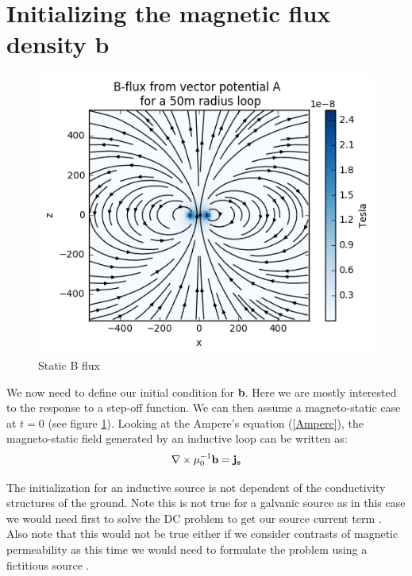 \documentclass[twoside]{article}
\begin{document}
\section{Initializing the magnetic flux density \textbf{b}}

\begin{figure}[!ht]
\centering
\includegraphics[scale=0.8]{./figures/initialisation/Bfield.png}
\caption{Static B flux}
\label{Static_B}
\end{figure}

We now need to define our initial condition for \textbf{b}. Here we are mostly interested to the response to a step-off function. We can then assume a magneto-static case at $t=0$ (see figure \ref{Static_B}).
Looking at the Ampere's equation (\ref{Ampere}), the magneto-static field generated by an inductive loop can be written as:
\begin{equation}
\nabla \times \mu_0^{-1}{\bf b} = \bf{j_s}
\end{equation}

The initialization for an inductive source is not dependent of the conductivity structures of the ground. Note this is not true for a galvanic source as in this case we would need first to solve the DC problem to get our source current term \cite{Haber:2014}. Also note that this would not be true either if we consider contrasts of magnetic permeability as this time we would need to formulate the problem using a fictitious source \cite{Haber:2014}.
\end{document}

